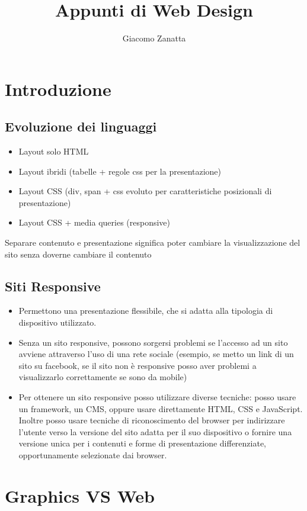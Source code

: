 \documentclass{article}
\title{Appunti di Web Design}
\author{Giacomo Zanatta}
\begin{document}
\maketitle
\tableofcontents
\newpage
\section{Introduzione}
\subsection{Evoluzione dei linguaggi}
\begin{itemize}
\item Layout solo HTML
\item Layout ibridi (tabelle + regole css per la presentazione)
\item Layout CSS (div, span + css evoluto per caratteristiche posizionali di presentazione)
\item Layout CSS + media queries (responsive)
\end{itemize}
Separare contenuto e presentazione significa poter cambiare la visualizzazione del sito senza doverne cambiare il contenuto
\subsection{Siti Responsive}
\begin{itemize}
\item Permettono una presentazione flessibile, che si adatta alla tipologia di dispositivo utilizzato.
\item Senza un sito responsive, possono sorgersi problemi se l'accesso ad un sito avviene attraverso l'uso di una rete sociale (esempio, se metto un link di un sito su facebook, se il sito non è responsive posso aver problemi a visualizzarlo correttamente se sono da mobile)
\item Per ottenere un sito responsive posso utilizzare diverse tecniche: posso usare un framework, un CMS, oppure usare direttamente HTML, CSS e JavaScript. Inoltre posso usare tecniche di riconoscimento del browser per indirizzare l'utente verso la versione del sito adatta per il suo dispositivo o fornire una versione unica per i contenuti e forme di presentazione differenziate, opportunamente selezionate dai browser.
\end{itemize}
\section{Graphics VS Web}
\end{document}
